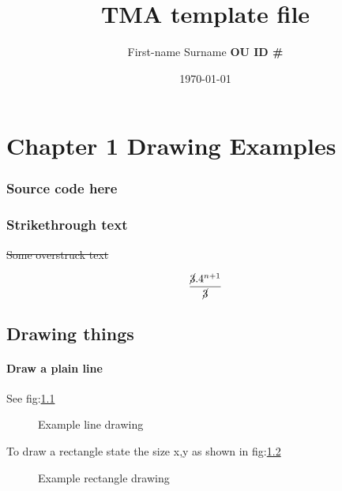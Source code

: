 \documentclass{report}
\title{\Large{\textbf{TMA template file}}}
\author{First-name Surname {\textbf{OU ID \#}}}
\date{\today}
\begin{document}
\begin{titlepage}
\maketitle
\end{titlepage}

\tableofcontents
\pagebreak


\pagestyle{fancy}
\fancyhf{}

\chapter{Chapter 1 Drawing Examples}

\subsection*{Source code here}

\subsection*{Strikethrough text}

\st{Some overstruck text}

\[ \frac{\cancel{3}.4^{n+1}}{\cancel{3}}\\ \]

\section{Drawing things}

\subsubsection{Draw a plain line}
 See fig:\ref{Example line drawing}
\begin{figure}[ht]
\caption{Example line drawing}
\label{Example line drawing}
\end{figure}



To draw a rectangle state the size x,y as shown in fig:\ref{Example rectangle drawing}

\begin{figure}[ht]
\caption{Example rectangle drawing}
\label{Example rectangle drawing}
\end{figure}
\end{document}
